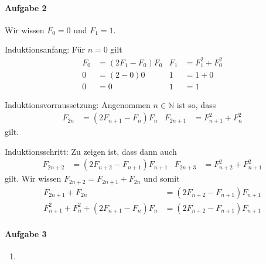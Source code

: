 \documentclass{article}
\begin{document}
\paragraph{Aufgabe 2}

Wir wissen $F_0 = 0$ und $F_1 = 1$.

Induktionsanfang: Für $n = 0$ gilt
\begin{align*}
    F_0 &= (2F_1 - F_0)F_0     & F_1 &= F^{2}_{1} + F^{2}_{0} \\
    0 &= (2 - 0)0              & 1 &= 1 + 0 \\
    0 &= 0                     & 1 &= 1
\end{align*}

Induktionsvorraussetzung: Angenommen $n \in \mathbb{N}$ ist so, dass
\begin{align*}
    F_{2n} &= (2F_{n + 1} - F_n)F_n & F_{2n + 1} &= F^{2}_{n + 1} + F^{2}_{n}
\end{align*}
gilt.

Induktionsschritt: Zu zeigen ist, dass dann auch
\begin{align*}
    F_{2n + 2} &= (2F_{n + 2} - F_{n + 1})F_{n + 1} & F_{2n + 3} &= F^{2}_{n + 2} + F^{2}_{n + 1}
\end{align*}
gilt. Wir wissen $F_{2n + 2} = F_{2n + 1} + F_{2n}$ und somit
\begin{align*}
    F_{2n + 1} + F_{2n} &= (2F_{n + 2} - F_{n + 1})F_{n + 1} \\
    F^{2}_{n + 1} + F^{2}_{n} + (2F_{n + 1} - F_n)F_n &= (2F_{n + 2} - F_{n + 1})F_{n + 1}
\end{align*}

\paragraph{Aufgabe 3}

\begin{enumerate}
    \item 
\end{enumerate}
\end{document}
